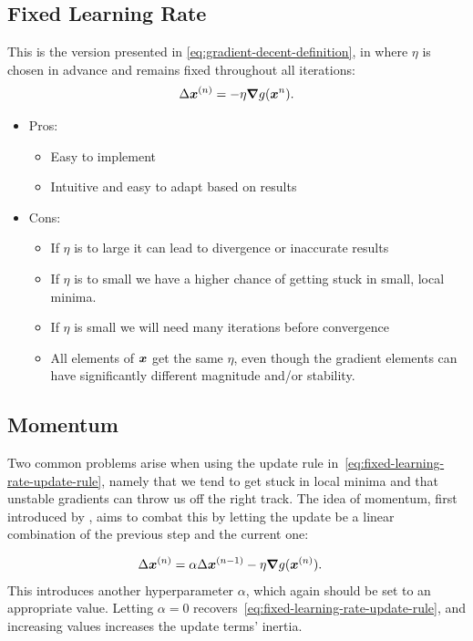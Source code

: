 \documentclass[Thesis.tex]{subfiles}
\begin{document}
\subsection{Fixed Learning Rate}

This is the version presented in \cref{eq:gradient-decent-definition}, in where
$\eta$ is chosen in advance and remains fixed throughout all iterations:
\begin{align}
  \label{eq:fixed-learning-rate-update-rule}
  \Delta \bm{x}^{(n)} = -\eta \grad{g(\bm{x}^{n})}.
\end{align}

\begin{itemize}
\item Pros:
  \begin{itemize}
    \item Easy to implement
    \item Intuitive and easy to adapt based on results
  \end{itemize}
\item Cons:
  \begin{itemize}
    \item If $\eta$ is to large it can lead to divergence or inaccurate results
    \item If $\eta$ is to small we have a higher chance of getting stuck in small, local minima.
    \item If $\eta$ is small we will need many iterations before convergence
    \item All elements of $\bm{x}$ get the same $\eta$, even though the gradient
        elements can have significantly different magnitude and/or stability.
  \end{itemize}
\end{itemize}

\subsection{Momentum}

Two common problems arise when using the update rule
in~\cref{eq:fixed-learning-rate-update-rule}, namely that we tend to get stuck
in local minima and that unstable gradients can throw us off the right track.
The idea of momentum, first introduced by \textcite{Rumelhart-1986}, aims to
combat this by letting the update be a linear combination of the previous step
and the current one:

\begin{align}
  \label{eq:momentum-update-rule-def}
  \Delta\bm{x}^{(n)} &= \alpha \Delta \bm{x}^{(n-1)} - \eta \grad{g(\bm{x}^{(n)})}.
\end{align}
This introduces another hyperparameter $\alpha$, which again should be set to
an appropriate value. Letting $\alpha=0$
recovers~\cref{eq:fixed-learning-rate-update-rule}, and increasing values
increases the update terms' inertia.
\end{document}
